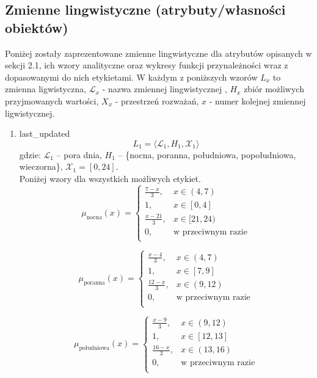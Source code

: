\documentclass{article}
\begin{document}
\subsection{Zmienne lingwistyczne (atrybuty/własności obiektów)}
Poniżej zostały zaprezentowane zmienne lingwistyczne dla atrybutów opisanych w sekcji 2.1, ich wzory analityczne oraz wykresy funkcji przynależności wraz z dopasowanymi do nich etykietami. W każdym z poniższych wzorów \(L_x\) to zmienna ligwistyczna, $\mathcal{L}_x$ - nazwa zmiennej lingwistycznej , \(H_x\) zbiór możliwych przyjmowanych wartości, \(X_x\) - przestrzeń rozważań, \(x\) - numer kolejnej zmiennej ligwistycznej. 
\begin{enumerate}
    \item last\_updated
        \begin{equation}
            L_1 = \langle \mathcal{L}_1, H_1, \mathcal{X}_1 \rangle
        \end{equation}
        gdzie: $\mathcal{L}_1$ – pora dnia, $H_1$ – \{nocna, poranna, południowa, popołudniowa, wieczorna\}, $\mathcal{X}_1 = [0, 24]$. \\
        Poniżej wzory dla wszystkich możliwych etykiet.
        \begin{equation}
            \mu_{\text{nocna}}(x) =
            \begin{cases}
            \frac{7 - x}{3}, & x \in (4, 7) \\
            1, & x \in [0, 4] \\
            \frac{x - 21}{3}, & x \in [21, 24) \\
            0, & \text{w przeciwnym razie} \\
            \end{cases}
        \end{equation}

        \begin{equation}
            \mu_{\text{poranna}}(x) =
            \begin{cases}
            \frac{x - 4}{3}, & x \in (4, 7) \\
            1, & x \in [7, 9] \\
            \frac{12 - x}{3}, & x \in (9, 12) \\
            0, & \text{w przeciwnym razie} \\
            \end{cases}
        \end{equation}

        \begin{equation}
            \mu_{\text{południowa}}(x) =
            \begin{cases}
            \frac{x - 9}{3}, & x \in (9, 12) \\
            1, & x \in [12, 13] \\
            \frac{16 - x}{3}, & x \in (13, 16) \\
            0, & \text{w przeciwnym razie} \\
            \end{cases}
        \end{equation}


\end{enumerate}
\end{document}
